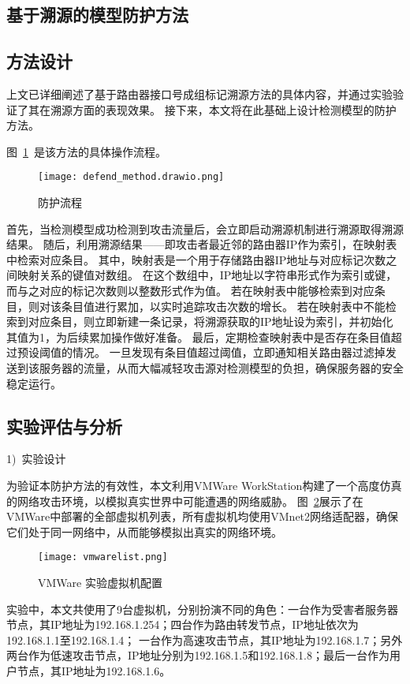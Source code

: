 \begin{enumerate}[a.]
\begin{enumerate}[a.]
\begin{enumerate}[a.]
\begin{enumerate}[a.]
\begin{enumerate}[a.]
\begin{enumerate}[a.]
\begin{enumerate}[a.]
\section{基于溯源的模型防护方法}
\subsection{方法设计}
上文已详细阐述了基于路由器接口号成组标记溯源方法的具体内容，并通过实验验证了其在溯源方面的表现效果。
接下来，本文将在此基础上设计检测模型的防护方法。\par
图~\ref{fig:defend_procedure}~是该方法的具体操作流程。
\begin{figure}[h]
	\centering
	\texttt{[image: defend\_method.drawio.png]}
	\caption{防护流程}
	\label{fig:defend_procedure}
\end{figure}
首先，当检测模型成功检测到攻击流量后，会立即启动溯源机制进行溯源取得溯源结果。
随后，利用溯源结果——即攻击者最近邻的路由器IP作为索引，在映射表中检索对应条目。
其中，映射表是一个用于存储路由器IP地址与对应标记次数之间映射关系的键值对数组。
在这个数组中，IP地址以字符串形式作为索引或键，而与之对应的标记次数则以整数形式作为值。
若在映射表中能够检索到对应条目，则对该条目值进行累加，以实时追踪攻击次数的增长。
若在映射表中不能检索到对应条目，则立即新建一条记录，将溯源获取的IP地址设为索引，并初始化其值为1，为后续累加操作做好准备。
最后，定期检查映射表中是否存在条目值超过预设阈值的情况。
一旦发现有条目值超过阈值，立即通知相关路由器过滤掉发送到该服务器的流量，从而大幅减轻攻击源对检测模型的负担，确保服务器的安全稳定运行。


\subsection{实验评估与分析}
1)~实验设计\par
为验证本防护方法的有效性，本文利用VMWare WorkStation构建了一个高度仿真的网络攻击环境，以模拟真实世界中可能遭遇的网络威胁。
图~\ref{fig:vmwarelist}展示了在VMWare中部署的全部虚拟机列表，所有虚拟机均使用VMnet2网络适配器，确保它们处于同一网络中，从而能够模拟出真实的网络环境。
\begin{figure}[h]
	\centering
	\texttt{[image: vmwarelist.png]}
	\caption{VMWare 实验虚拟机配置}
	\label{fig:vmwarelist}
\end{figure}
实验中，本文共使用了9台虚拟机，分别扮演不同的角色：一台作为受害者服务器节点，其IP地址为192.168.1.254；四台作为路由转发节点，IP地址依次为192.168.1.1至192.168.1.4；
一台作为高速攻击节点，其IP地址为192.168.1.7；另外两台作为低速攻击节点，IP地址分别为192.168.1.5和192.168.1.8；最后一台作为用户节点，其IP地址为192.168.1.6。\par


\end{enumerate}
\end{enumerate}
\end{enumerate}
\end{enumerate}
\end{enumerate}
\end{enumerate}
\end{enumerate}

